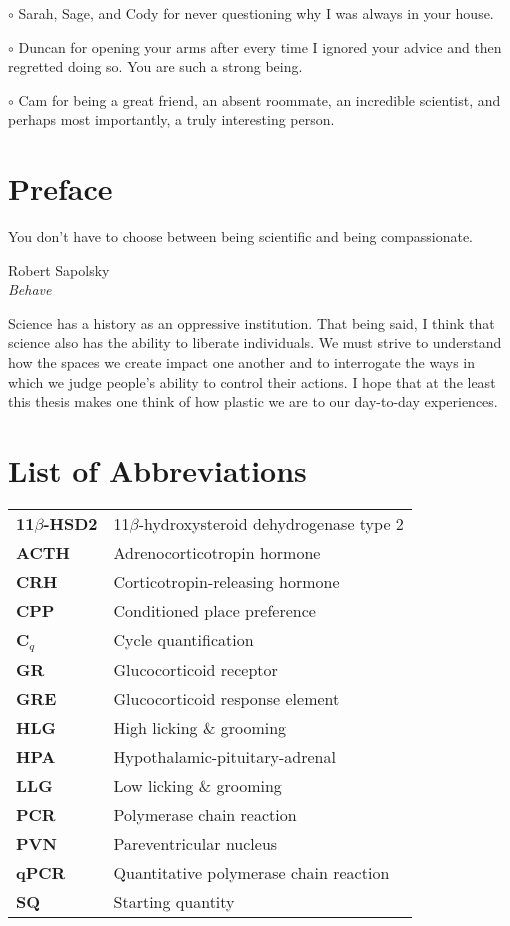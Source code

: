 \documentclass[12pt,twoside]{reedthesis}
\begin{document}
$\circ$ Sarah, Sage, and Cody for never questioning why I was always in your house.

$\circ$ Duncan for opening your arms after every time I ignored your advice and then regretted doing so. You are such a strong being.

 $\circ$ Cam for being a great friend, an absent roommate, an incredible scientist, and perhaps most importantly, a truly interesting person.
	

    \chapter*{Preface}
	\epigraph{You don't have to choose between being scientific and being
compassionate.}{Robert Sapolsky \\ \textit{Behave}}

	Science has a history as an oppressive institution. That being said, I think
  that science also has the ability to liberate individuals. We must strive to understand how
the spaces we create impact one another and to interrogate the ways in which we
judge people's ability to control their actions. I hope that at the
  least this thesis makes one think of how plastic we are to our day-to-day experiences.

    \chapter*{List of Abbreviations}

	\begin{table}[h]
	\centering %
	\begin{tabular}{ll}
    \textbf{11$\beta$-HSD2} & 11$\beta$-hydroxysteroid dehydrogenase type 2\\
    \textbf{ACTH} & Adrenocorticotropin hormone\\
    \textbf{CRH} & Corticotropin-releasing hormone \\
    \textbf{CPP} & Conditioned place preference\\
    \textbf{C$_q$} & Cycle quantification \\
    \textbf{GR} & Glucocorticoid receptor \\
    \textbf{GRE} & Glucocorticoid response element \\
    \textbf{HLG} & High licking \& grooming \\
    \textbf{HPA} & Hypothalamic-pituitary-adrenal \\
    \textbf{LLG} & Low licking \& grooming \\
    \textbf{PCR} & Polymerase chain reaction\\
    \textbf{PVN} & Pareventricular nucleus \\
    \textbf{qPCR} & Quantitative polymerase chain reaction\\
    \textbf{SQ} & Starting quantity \\
   	\end{tabular}
	\end{table}
\end{document}
